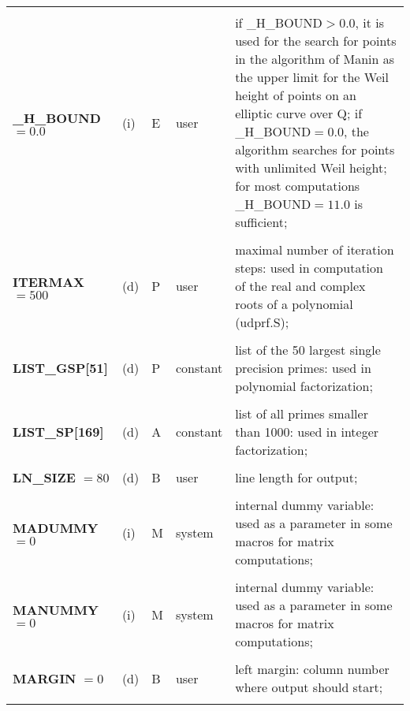 {{\begin{tabular}{p{1.65in}p{0.2in}|p{0.15in}|p{0.54in}|p{2.60in}}
                           &     &      &               & \\ 
{\bf \_H\_BOUND} $=0.0$    & (i) & E    & user          & if \_H\_BOUND$>0.0$, 
					it is used for the search for points in 
					the algorithm of Manin as the upper 
					limit for the Weil height of points on 
					an elliptic curve over Q; 
                        		if \_H\_BOUND$=0.0$, the algorithm 
					searches for points with unlimited Weil 
					height; for most computations 
                        		\_H\_BOUND$=11.0$ is sufficient; \\
                           &     &      &               & \\ 
{\bf ITERMAX} $=500$       & (d) & P    & user          & maximal number of iteration steps: used in computation of the real and complex roots of a polynomial
(udprf.S);\\
                           &     &      &               & \\
{\bf LIST\_GSP[51]}        & (d) & P    & constant      & list of the 50 largest single precision primes: used in polynomial
                                                          factorization;\\  
                           &     &      &               & \\
{\bf LIST\_SP[169]}        & (d) & A    & constant      & list of all primes smaller than 1000: used in integer factorization;\\
                           &     &      &               & \\ 
{\bf LN\_SIZE} $=80$       & (d) & B    & user          & line length for output;\\
                           &     &      &               & \\ 
{\bf MADUMMY} $=0$         & (i) & M    & system        & internal dummy variable: used as a par\-ameter in some macros for matrix com\-pu\-ta\-tions; \\
                           &     &      &               & \\ 
{\bf MANUMMY} $=0$         & (i) & M    & system        & internal dummy variable: used as a par\-ameter in some macros for matrix com\-pu\-ta\-tions; \\
                           &     &      &               & \\ 
{\bf MARGIN} $=0$          &(d)  & B    & user          & left margin: column number where output should start;\\
                           &     &      &               & \\ 

\end{tabular}}}
